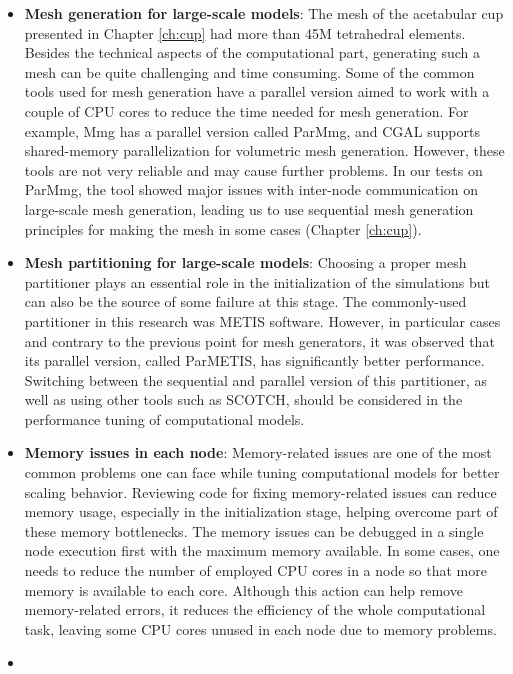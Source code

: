\begin{itemize}
\item
\textbf{Mesh generation for large-scale models}: The mesh of the acetabular cup presented in Chapter \ref{ch:cup} had more than 45M tetrahedral elements. Besides the technical aspects of the computational part, generating such a mesh can be quite challenging and time consuming. Some of the common tools used for mesh generation have a parallel version aimed to work with a couple of \gls{CPU} cores to reduce the time needed for mesh generation. For example, Mmg has a parallel version called ParMmg, and CGAL supports shared-memory parallelization for volumetric mesh generation. However, these tools are not very reliable and may cause further problems. In our tests on ParMmg, the tool showed major issues with inter-node communication on large-scale mesh generation, leading us to use sequential mesh generation principles for making the mesh in some cases (Chapter \ref{ch:cup}).
\item
\textbf{Mesh partitioning for large-scale models}: Choosing a proper mesh partitioner plays an essential role in the initialization of the simulations but can also be the source of some failure at this stage. The commonly-used partitioner in this research was METIS software. However, in particular cases and contrary to the previous point for mesh generators, it was observed that its parallel version, called ParMETIS, has significantly better performance. Switching between the sequential and parallel version of this partitioner, as well as using other tools such as SCOTCH, should be considered in the performance tuning of computational models.
\item
\textbf{Memory issues in each node}: Memory-related issues are one of the most common problems one can face while tuning computational models for better scaling behavior. Reviewing code for fixing memory-related issues can reduce memory usage, especially in the initialization stage, helping overcome part of these memory bottlenecks. The memory issues can be debugged in a single node execution first with the maximum memory available. In some cases, one needs to reduce the number of employed \gls{CPU} cores in a node so that more memory is available to each core. Although this action can help remove memory-related errors, it reduces the efficiency of the whole computational task, leaving some \gls{CPU} cores unused in each node due to memory problems.
\item

\end{itemize}
